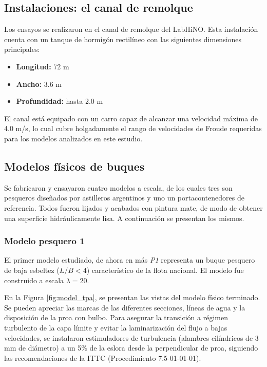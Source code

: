\subsection{Instalaciones: el canal de remolque}

Los ensayos se realizaron en el canal de remolque del LabHiNO. Esta instalación cuenta con un tanque de hormigón rectilíneo con las siguientes dimensiones principales:

\begin{itemize}
    \item \textbf{Longitud:} 72 m
    \item \textbf{Ancho:} 3.6 m
    \item \textbf{Profundidad:} hasta 2.0 m
\end{itemize}

El canal está equipado con un carro capaz de alcanzar una velocidad máxima de 4.0 m/s, lo cual cubre holgadamente el rango de velocidades de Froude requeridas para los modelos analizados en este estudio.

\subsection{Modelos físicos de buques \label{sec:presentacion_modelos}}

Se fabricaron y ensayaron cuatro modelos a escala, de los cuales tres son pesqueros diseñados por astilleros argentinos y uno un portacontenedores de referencia. Todos fueron lijados y acabados con pintura mate, de modo de obtener una superficie hidráulicamente lisa. A continuación se presentan los mismos.

\begingroup
\let\FloatBarrier\relax
\subsubsection{Modelo pesquero 1}
El primer modelo estudiado, de ahora en más \textit{P1} representa un buque pesquero de baja esbeltez ($L/B < 4$) característico de la flota nacional. El modelo fue construido a escala $\lambda = 20$.

En la Figura \ref{fig:model_tpa}, se presentan las vistas del modelo físico terminado. Se pueden apreciar las marcas de las diferentes secciones, líneas de agua y la disposición de la proa con bulbo. Para asegurar la transición a régimen turbulento de la capa límite y evitar la laminarización del flujo a bajas velocidades, se instalaron estimuladores de turbulencia (alambres cilíndricos de 3 mm de diámetro) a un 5\% de la eslora desde la perpendicular de proa, siguiendo las recomendaciones de la ITTC (Procedimiento 7.5-01-01-01).

